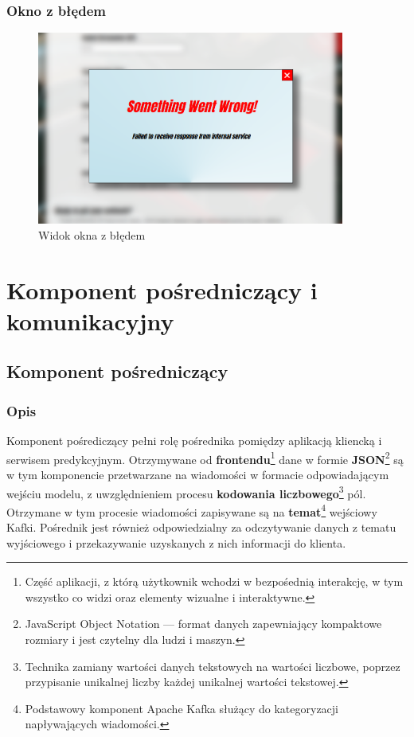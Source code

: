 \documentclass[12pt, a4paper]{report}
\begin{document}
\subsection{Okno z błędem}
\begin{figure}[H]
    \centering
    \includegraphics[width=0.9\textwidth]{images/error_view}
    \caption{Widok okna z błędem}
\end{figure}

\chapter{Komponent pośredniczący i komunikacyjny}
\section{Komponent pośredniczący}
\subsection{Opis}
Komponent pośrediczący pełni rolę pośrednika pomiędzy aplikacją kliencką i serwisem predykcyjnym.
Otrzymywane od \textbf{frontendu}\footnote{Część aplikacji, z którą użytkownik wchodzi w bezpośednią interakcję, w tym wszystko co widzi oraz elementy wizualne i interaktywne.}
dane w formie \textbf{JSON}\footnote{JavaScript Object Notation --- format danych zapewniający kompaktowe rozmiary i jest czytelny dla ludzi i maszyn.}
są w tym komponencie przetwarzane na wiadomości w formacie odpowiadającym wejściu modelu, z uwzględnieniem procesu \textbf{kodowania liczbowego}\footnote{
Technika zamiany wartości danych tekstowych na wartości liczbowe, poprzez przypisanie unikalnej liczby każdej unikalnej wartości tekstowej.
} pól. Otrzymane
w tym procesie wiadomości zapisywane są na \textbf{temat}\footnote{Podstawowy komponent Apache Kafka służący do kategoryzacji napływających wiadomości.}
 wejściowy Kafki. Pośrednik jest również odpowiedzialny za odczytywanie danych z tematu wyjściowego i
przekazywanie uzyskanych z nich informacji do klienta.
\end{document}
